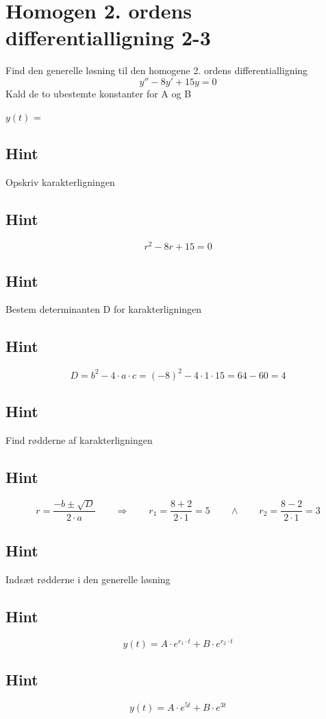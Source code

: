 \documentclass{article}
\newenvironment{exercise}[1]{\newpage\section{#1}}{}
\newcommand{\answerbox}[1]{\fbox{$#1$}}
\newcommand{\hint}{\subsection*{Hint}}
\begin{document}
\begin{exercise}{Homogen 2. ordens differentialligning 2-3}
	
	Find den generelle løsning til den homogene 2. ordens differentialligning
\[
y'' - 8y' + 15y = 0
\]
Kald de to ubestemte konstanter for A og B

$y(t)$ = \answerbox{A \cdot e^{5t} + B \cdot e^{3t}}


\hint 

Opskriv karakterligningen

\hint

\[
r^2 -8r + 15 = 0
\]


\hint

Bestem determinanten D for karakterligningen


\hint 
\[
D = b^2 - 4 \cdot a \cdot c = (-8)^2 - 4 \cdot 1 \cdot 15  = 64 - 60 = 4
\]

\hint 
Find rødderne af karakterligningen


\hint

\[
r = \frac{-b \pm \sqrt{D}}{2 \cdot a} \qquad  \Rightarrow \qquad r_1 = \frac{8 + 2}{2 \cdot 1} = 5 \qquad \wedge \qquad r_2 = \frac{8- 2}{2 \cdot 1} = 3
\]

\hint

Indsæt rødderne i den generelle løsning

\hint
\[
y(t) = A \cdot e^{r_1 \cdot t} + B \cdot e^{r_2\cdot t}
\]

\hint

\[
y(t) = A \cdot e^{5t} + B \cdot e^{3t}
\]
	
\end{exercise}

\newpage
\end{document}
